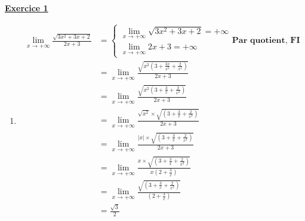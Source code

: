 \documentclass[12pt,a4paper]{article}
\begin{document}
\textbf{\underline{Exercice 1}}
\begin{enumerate}[start=16]
    \item
          $$
              \begin{aligned}
                  \lim\limits_{x \to +\infty} \frac{\sqrt{3x^2 + 3x + 2}}{2x + 3} & =
                  \begin{cases}
                      \lim\limits_{x \to +\infty}\sqrt{3x^2 + 3x + 2}=+\infty \\
                      \lim\limits_{x \to +\infty} 2x+3=+\infty
                  \end{cases}\textbf{Par quotient, FI}                                                                                                                                         \\
                                                                                  & = \lim\limits_{x \to +\infty} \frac{\sqrt{x^2\left(3+\frac{3x}{x^{2}} +\frac{2}{x^{2}} \right)}}{2x + 3}                      \\
                                                                                  & = \lim\limits_{x \to +\infty} \frac{\sqrt{x^2\left(3+\frac{3}{x} +\frac{2}{x^{2}} \right)}}{2x + 3}                           \\
                                                                                  & = \lim\limits_{x \to +\infty} \frac{\sqrt{x^2}\times \sqrt{\left(3+\frac{3}{x} +\frac{2}{x^{2}} \right)}}{2x + 3}             \\
                                                                                  & = \lim\limits_{x \to +\infty} \frac{|x|\times \sqrt{\left(3+\frac{3}{x} +\frac{2}{x^{2}} \right)}}{2x + 3}                    \\
                                                                                  & = \lim\limits_{x \to +\infty} \frac{x\times \sqrt{\left(3+\frac{3}{x} +\frac{2}{x^{2}} \right)}}{x\left(2+\frac{3}{x}\right)} \\
                                                                                  & = \lim\limits_{x \to +\infty} \frac{\sqrt{\left(3+\frac{3}{x} +\frac{2}{x^{2}} \right)}}{\left(2+\frac{3}{x}\right)}          \\
                                                                                  & = \frac{\sqrt{3}}{2}                                                                                                          \\
              \end{aligned}
          $$
\end{enumerate}
\end{document}
